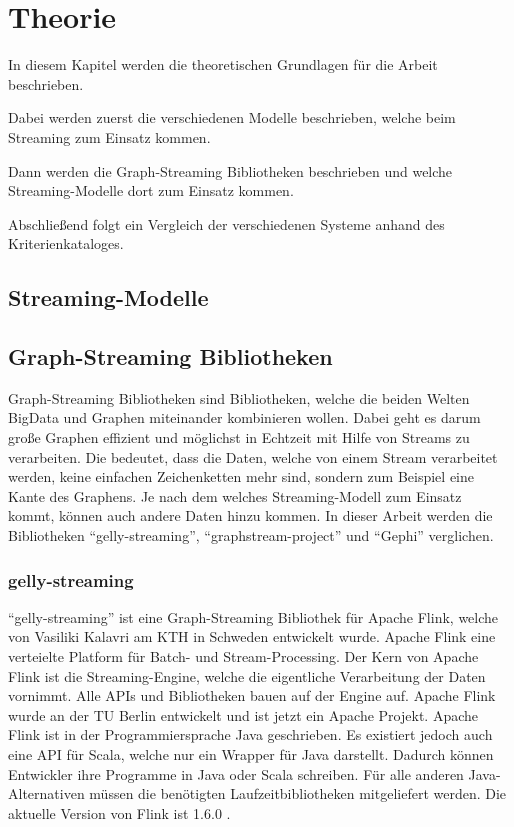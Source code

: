 \chapter{Theorie}
In diesem Kapitel werden die theoretischen Grundlagen für die Arbeit beschrieben.

Dabei werden zuerst die verschiedenen Modelle beschrieben, welche beim Streaming
zum Einsatz kommen.

Dann werden die Graph-Streaming Bibliotheken beschrieben und welche
Streaming-Modelle dort zum Einsatz kommen.

Abschließend folgt ein Vergleich der verschiedenen Systeme anhand des
Kriterienkataloges.

\section{Streaming-Modelle}
\section{Graph-Streaming Bibliotheken}
Graph-Streaming Bibliotheken sind Bibliotheken, welche die beiden Welten \gls{BigData}
und Graphen miteinander kombinieren wollen. Dabei geht es darum große Graphen
effizient und möglichst in Echtzeit mit Hilfe von Streams zu verarbeiten. Die
bedeutet, dass die Daten, welche von einem Stream verarbeitet werden, keine
einfachen Zeichenketten mehr sind, sondern zum Beispiel eine Kante des Graphens.
Je nach dem welches Streaming-Modell zum Einsatz kommt, können auch andere Daten
hinzu kommen. In dieser Arbeit werden die Bibliotheken \enquote{gelly-streaming},
\enquote{graphstream-project} und \enquote{Gephi} verglichen.

\subsection{gelly-streaming}
\enquote{gelly-streaming} ist eine Graph-Streaming Bibliothek für Apache Flink,
welche von Vasiliki Kalavri am KTH in Schweden entwickelt wurde. Apache Flink
eine verteielte Platform für Batch- und Stream-Processing. Der Kern von
Apache Flink ist die Streaming-Engine, welche die eigentliche Verarbeitung der
Daten vornimmt. Alle \glspl{API} und Bibliotheken bauen auf der Engine auf.
Apache Flink wurde an der TU Berlin entwickelt und ist jetzt ein Apache Projekt.
Apache Flink ist in der Programmiersprache Java geschrieben. Es existiert jedoch
auch eine \gls{API} für Scala, welche nur ein Wrapper für Java darstellt. Dadurch
können Entwickler ihre Programme in Java oder Scala schreiben. Für alle anderen
Java-Alternativen müssen die benötigten Laufzeitbibliotheken mitgeliefert
werden. Die aktuelle Version von Flink ist 1.6.0 .

